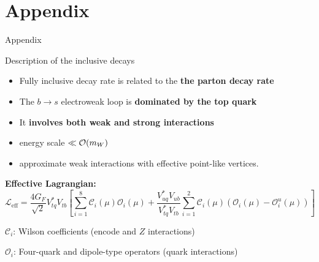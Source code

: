 \documentclass[xcolor=dvipsnames]{beamer}
\begin{document}
\section{Appendix}

\begin{frame}

   \centering\Large

   Appendix

\end{frame}

\begin{frame}{Description of the inclusive decays}
   \scriptsize

   \begin{itemize}
      \item Fully inclusive decay rate is related to the \textbf{the parton decay rate}
      \item The $b\to s$ electroweak loop is \textbf{dominated by the top quark} 
      \item It \textbf{involves both weak and strong interactions}
      \item[\ra] energy scale $\ll{\ensuremath{\cal O}}(m_W)$
      \item[\ra] approximate weak interactions with effective point-like vertices.
   \end{itemize}

   \textbf{Effective Lagrangian:}
   \begin{equation}\nonumber
      \mathcal{L}_{\mathrm{eff}} = \frac{4G_F}{\sqrt{2}}V_{tq}^*V_{tb}\left[\sum^{8}_{i=1}\mathcal{C}_i(\mu)\mathcal{O}_i(\mu)
                                                  + \frac{V^*_{uq}V_{ub}}{V^*_{tq}V_{tb}}\sum^{2}_{i=1}\mathcal{C}_i(\mu)(\mathcal{O}_i(\mu)-\mathcal{O}_i^u(\mu))\right]
  \end{equation}

  \vspace{10pt}

  $\mathcal{C}_i$: Wilson coefficients (encode \Wpm and $Z$ interactions)
  
  $\mathcal{O}_i$: Four-quark and dipole-type operators (quark interactions)

\end{frame}
\end{document}
